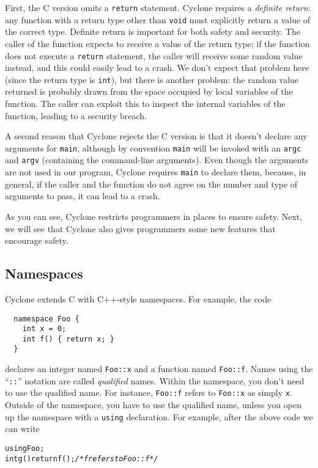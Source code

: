 First, the C version omits a \texttt{return} statement.  Cyclone
requires a \emph{definite return}: any function with a return type
other than \texttt{void} must explicitly return a value of the correct
type.  Definite return is important for both safety and security.  The
caller of the function expects to receive a value of the return type;
if the function does not execute a \texttt{return} statement, the
caller will receive some random value instead, and this could easily
lead to a crash.  We don't expect that problem here (since the return
type is \texttt{int}), but there is another problem: the random value
returned is probably drawn from the space occupied by local variables
of the function.  The caller can exploit this to inspect the internal
variables of the function, leading to a security breach.

A second reason that Cyclone rejects the C version is that it doesn't
declare any arguments for \texttt{main}, although by convention
\texttt{main} will be invoked with an \texttt{argc} and \texttt{argv}
(containing the command-line arguments).  Even though the arguments
are not used in our program, Cyclone requires \texttt{main} to declare
them, because, in general, if the caller and the function do not agree
on the number and type of arguments to pass, it can lead to a crash.

As you can see, Cyclone restricts programmers in places to ensure
safety.  Next, we will see that Cyclone also gives programmers some
new features that encourage safety.

\subsection{Namespaces}
Cyclone extends C with C++-style namespaces.  For example, the code
\begin{verbatim}
  namespace Foo { 
    int x = 0; 
    int f() { return x; } 
  }
\end{verbatim}
declares an integer named \texttt{Foo::x} and a function named
\texttt{Foo::f}.  Names using the ``\texttt{::}'' notation are called
\emph{qualified} names.  Within the namespace, you don't need to use
the qualified name.  For instance, \texttt{Foo::f} refers to
\texttt{Foo::x} as simply \texttt{x}.  Outside of the namespace, you
have to use the qualified name, unless you open up the namespace with
a \texttt{using} declaration.  For example, after the above code we
can write
\begin{alltt}
  using Foo;
  int g() {\lb} return f(); {\rb} \textit{/* f refers to Foo::f */}
\end{alltt}

